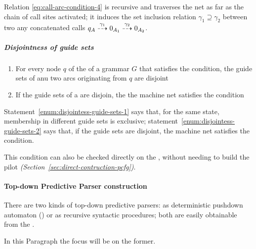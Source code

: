 \documentclass[english]{article}
\begin{document}
Relation \ref{eq:call-arc-condition-4} is recursive and traverses the net as far as the chain of call sites activated;
it induces the set inclusion relation \(\gamma_1 \supseteq \gamma_2\) between two any concatenated calls \(q_A \stackrel{\gamma_1}{\dashrightarrow} 0_{A_1} \stackrel{\gamma_2}{\dashrightarrow} 0_{A_2}\).

\subparagraph*{Disjointness of guide sets}

\begin{enumerate}[label=\textbf{\Alph*.}, ref=(\Alph*)]
  \item\label{enum:disjointess-guide-sets-1} For every node \(q\) of the \PCFG of a grammar \(G\) that satisfies the \ello condition, the guide sets of anu two arcs originating from \(q\) are disjoint
  \item\label{enum:disjointess-guide-sets-2} If the guide sets of a \PCFG are disjoin, the the machine net satisfies the \ello condition
\end{enumerate}

\bigskip
Statement~\ref{enum:disjointess-guide-sets-1} says that, for the same state, membership in different guide sets is exclusive;
statement~\ref{enum:disjointess-guide-sets-2} says that, if the guide sets are disjoint, the machine net satisfies the \ello condition.

This condition can also be checked directly on the \PCFG, without needing to build the \elro pilot \textit{(Section~\ref{sec:direct-contruction-pcfg})}.

\paragraph{Top-down Predictive Parser construction}
\label{par:top-down-predictive-parser-construction}

There are two kinds of top-down predictive parsers:
as deterministic pushdown automaton (\DPDA) or as recursive syntactic procedures;
both are easily obtainable from the \PCFG.

In this Paragraph the focus will be on the former.
\end{document}
